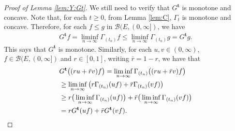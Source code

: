 \documentclass[12pt,a4paper]{amsart}
\numberwithin{equation}{section}
\theoremstyle{plain}
\theoremstyle{definition}
\begin{document}
\begin{proof}[Proof of Lemma \ref{lem:Y:Gt}]
  We still need to verify that $G^{\mathbf t}$ is monotone and concave.
  Note that, for each $t\geq 0$, from Lemma \ref{lem:C}, $\Gamma_t$ is monotone and concave. 
  Therefore, for each $f \leq g$ in $\mathcal B(E,(0,\infty])$, we have
\begin{align}
	G^{\mathbf t} f = \liminf_{n\to \infty} \Gamma_{(t_n)} f
  \leq \liminf_{n\to \infty} \Gamma_{(t_n)} g
  = G^{\mathbf t} g.
\end{align}
This says that $G^{\mathbf t}$ is monotone. 
Similarly, for each $u,v \in (0,\infty)$, $f\in \mathcal B(E,(0,\infty])$ and $r \in [0,1]$, writing $\bar r = 1 - r$, we have that
\begin{align}
	& G^{\mathbf t}\big((ru + \bar rv)f\big)
  = \liminf_{n \to \infty} \Gamma_{(t_n)}\big((ru + \bar rv)f\big)\\
  & \geq \liminf_{n\to \infty} \big(r\Gamma_{(t_n)} (uf) + \bar r\Gamma_{(t_n)}(vf)\big) \\
 & \geq r \big(\liminf_{n\to \infty} \Gamma_{(t_n)} (uf)\big) + \bar r \big(\liminf_{n\to \infty} \Gamma_{(t_n)}(vf) \big) \\
  & = r G^{\mathbf t} (uf) + \bar r G^{\mathbf t}(vf).
\qedhere
\end{align} 
\end{proof}
\end{document}
